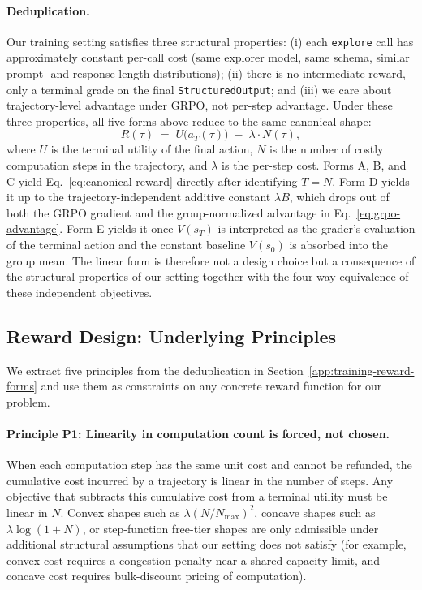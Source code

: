 \paragraph{Deduplication.}
Our training setting satisfies three structural properties: (i) each \texttt{explore} call has approximately constant per-call cost (same explorer model, same schema, similar prompt- and response-length distributions); (ii) there is no intermediate reward, only a terminal grade on the final \texttt{StructuredOutput}; and (iii) we care about trajectory-level advantage under GRPO, not per-step advantage. Under these three properties, all five forms above reduce to the same canonical shape:
\begin{equation}
R(\tau) \;=\; U\bigl(a_T(\tau)\bigr) \;-\; \lambda\cdot N(\tau),
\label{eq:canonical-reward}
\end{equation}
where $U$ is the terminal utility of the final action, $N$ is the number of costly computation steps in the trajectory, and $\lambda$ is the per-step cost. Forms A, B, and C yield Eq.~\eqref{eq:canonical-reward} directly after identifying $T = N$. Form D yields it up to the trajectory-independent additive constant $\lambda B$, which drops out of both the GRPO gradient and the group-normalized advantage in Eq.~\eqref{eq:grpo-advantage}. Form E yields it once $V(s_T)$ is interpreted as the grader's evaluation of the terminal action and the constant baseline $V(s_0)$ is absorbed into the group mean. The linear form is therefore not a design choice but a consequence of the structural properties of our setting together with the four-way equivalence of these independent objectives.

\subsection{Reward Design: Underlying Principles}
\label{app:training-reward-principles}

We extract five principles from the deduplication in Section~\ref{app:training-reward-forms} and use them as constraints on any concrete reward function for our problem.

\paragraph{Principle P1: Linearity in computation count is forced, not chosen.}
When each computation step has the same unit cost and cannot be refunded, the cumulative cost incurred by a trajectory is linear in the number of steps. Any objective that subtracts this cumulative cost from a terminal utility must be linear in $N$. Convex shapes such as $\lambda (N/N_{\max})^2$, concave shapes such as $\lambda\log(1+N)$, or step-function free-tier shapes are only admissible under additional structural assumptions that our setting does not satisfy (for example, convex cost requires a congestion penalty near a shared capacity limit, and concave cost requires bulk-discount pricing of computation).

